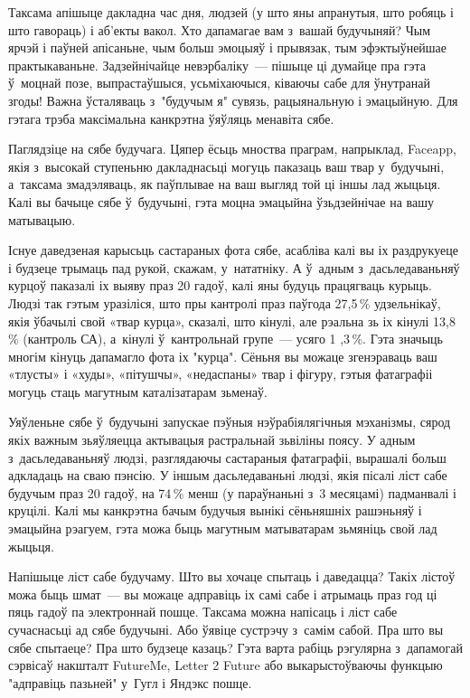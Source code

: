 Таксама апішыце дакладна час дня, людзей (у што яны апранутыя, што робяць і што гавораць) і аб'екты вакол. Хто дапамагае вам з~вашай будучыняй? Чым ярчэй і паўней апісаньне, чым больш эмоцыяў і прывязак, тым эфэктыўнейшае практыкаваньне. Задзейнічайце невэрбаліку~--- пішыце ці думайце пра гэта ў~моцнай позе, выпрастаўшыся, усьміхаючыся, ківаючы сабе для ўнутранай згоды! Важна ўсталяваць з~"будучым я" сувязь, рацыянальную і эмацыйную. Для гэтага трэба максімальна канкрэтна ўяўляць менавіта сябе.

Паглядзіце на сябе будучага. Цяпер ёсьць мноства праграм, напрыклад, Faceapp, якія з~высокай ступеньню дакладнасьці могуць паказаць ваш твар у~будучыні, а~таксама змадэляваць, як паўплывае на ваш выгляд той ці іншы лад жыцьця. Калі вы бачыце сябе ў~будучыні, гэта моцна эмацыйна ўзьдзейнічае на вашу матывацыю.

Існуе даведзеная карысьць састараных фота сябе, асабліва калі вы іх раздрукуеце і будзеце трымаць пад рукой, скажам, у~нататніку. А ў~адным з~дасьледаваньняў курцоў паказалі іх выяву праз 20 гадоў, калі яны будуць працягваць курыць. Людзі так гэтым уразіліся, што пры кантролі праз паўгода 27,5\,\% удзельнікаў, якія ўбачылі свой «твар курца», сказалі, што кінулі, але рэальна зь іх кінулі 13,8\,\% (кантроль СА), а~кінулі ў~кантрольнай групе~--- усяго 1 ,3\,\%. Гэта значыць многім кінуць дапамагло фота іх "курца". Сёньня вы можаце згенэраваць ваш «тлусты» і «худы», «пітушчы», «недаспаны» твар і фігуру, гэтыя фатаграфіі могуць стаць магутным каталізатарам зьменаў.

Уяўленьне сябе ў~будучыні запускае пэўныя нэўрабіялягічныя мэханізмы, сярод якіх важным зьяўляецца актывацыя растральнай зьвіліны поясу. У адным з~дасьледаваньняў людзі, разглядаючы састараныя фатаграфіі, вырашалі больш адкладаць на сваю пэнсію. У іншым дасьледаваньні людзі, якія пісалі ліст сабе будучым праз 20 гадоў, на 74\,\% менш (у параўнаньні з~3 месяцамі) падманвалі і круцілі. Калі мы канкрэтна бачым будучыя вынікі сёньняшніх рашэньняў і эмацыйна рэагуем, гэта можа быць магутным матыватарам зьмяніць свой лад жыцьця. 

Напішыце ліст сабе будучаму. Што вы хочаце спытаць і даведацца? Такіх лістоў можа быць шмат~--- вы можаце адправіць іх самі сабе і атрымаць праз год ці пяць гадоў па электроннай пошце. Таксама можна напісаць і ліст сабе сучаснасьці ад сябе будучыні. Або ўявіце сустрэчу з~самім сабой. Пра што вы сябе спытаеце? Пра што будзеце казаць? Гэта варта рабіць рэгулярна з~дапамогай сэрвісаў накшталт FutureMe, Letter 2 Future або выкарыстоўваючы функцыю "адправіць пазьней" у~Гугл і Яндэкс пошце.

